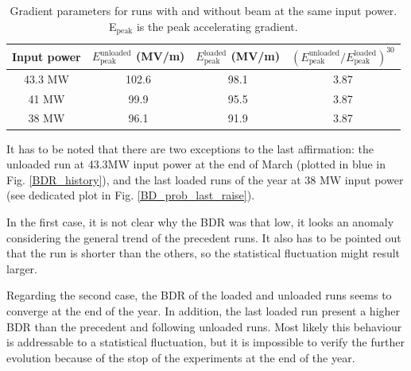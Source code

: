 \begin{table}[h]
  \centering
    \begin{tabular}{ c c c c }
    \hline
    \hline
    Input power 		&		$E^\text{unloaded} _\text{peak}$ (MV/m)		& 	$E^\text{loaded} _\text{peak}$ (MV/m)		&	$\left ( E^\text{unloaded} _\text{peak} / E^\text{loaded} _\text{peak} \right )^{30}$	\\
    \hline
    43.3 MW		&		102.6 								&	98.1									&	3.87		\\
    41 MW			&		99.9 									&	95.5									&	3.87		\\
    38 MW			&		96.1 									&	91.9									&	3.87		\\
    \hline
    \hline
    \end{tabular}
\caption{Gradient parameters for runs with and without beam at the same input power. E$_\text{peak}$ is the peak accelerating gradient.  }
\label{param_var_p}
\end{table}

It has to be noted that there are two exceptions to the last affirmation: the unloaded run at 43.3MW input power at the end of March (plotted in blue in Fig. \ref{BDR_history}), and the last loaded runs of the year at 38 MW input power (see dedicated plot in Fig. \ref{BD_prob_last_raise}). 

In the first case, it is not clear why the BDR was that low, it looks an anomaly considering the general trend of the precedent runs. It also has to be pointed out that the run is shorter than the others, so the statistical fluctuation might result larger.

Regarding the second case, the BDR of the loaded and unloaded runs seems to converge at the end of the year. In addition, the last loaded run present a higher BDR than the precedent and following unloaded runs. Most likely this behaviour is addressable to a statistical fluctuation, but  it is impossible to verify the further evolution because of the stop of the experiments at the end of the year.

